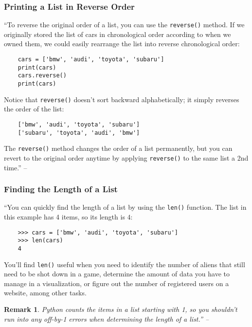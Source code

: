\documentclass[oneside]{book}
\numberwithin{equation}{section}
\newtheorem{remark}{Remark}[chapter]
\begin{document}
\subsubsection{Printing a List in Reverse Order}
``To reverse the original order of a list, you can use the \texttt{reverse()} method. If we originally stored the list of cars in chronological order according to when we owned them, we could easily rearrange the list into reverse chronological order:
\begin{verbatim}
	cars = ['bmw', 'audi', 'toyota', 'subaru']
	print(cars)
	cars.reverse()
	print(cars)
\end{verbatim}
Notice that \texttt{reverse()} doesn't sort backward alphabetically; it simply reverses the order of the list:
\begin{verbatim}
	['bmw', 'audi', 'toyota', 'subaru']
	['subaru', 'toyota', 'audi', 'bmw']
\end{verbatim}
The \texttt{reverse()} method changes the order of a list permanently, but you can revert to the original order anytime by applying \texttt{reverse()} to the same list a 2nd time.'' -- \cite[p. 45]{Matthes2019}

\subsubsection{Finding the Length of a List}
``You can quickly find the length of a list by using the \texttt{len()} function. The list in this example has 4 items, so its length is $4$:
\begin{verbatim}
	>>> cars = ['bmw', 'audi', 'toyota', 'subaru']
	>>> len(cars)
	4
\end{verbatim}
You'll find \texttt{len()} useful when you need to identify the number of aliens that still need to be shot down in a game, determine the amount of data you have to manage in a visualization, or figure out the number of registered users on a website, among other tasks.

\begin{remark}
	Python counts the items in a list starting with 1, so you shouldn't run into any off-by-1 errors when determining the length of a list.'' -- \cite[p. 45]{Matthes2019}
\end{remark}
\end{document}
